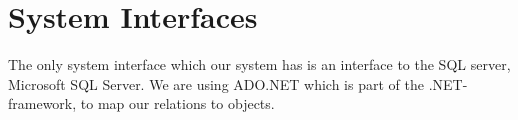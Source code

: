 \section{System Interfaces}
\label{sec:system_interfaces}
The only system interface which our system has is an interface to the SQL server, Microsoft SQL Server.
We are using ADO.NET which is part of the .NET-framework, to map our relations to objects.
